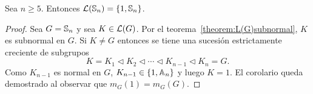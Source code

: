 \begin{corollary}
	Sea $n\geq5$. Entonces $\mathcal{L}(\mathbb{S}_n)=\{1,\mathbb{S}_n\}$. 
\end{corollary}

\begin{proof}
	Sea $G=\mathbb{S}_n$ y sea $K\in\mathcal{L}(G)$. Por el
	teorema~\ref{theorem:L(G)subnormal}, $K$ es subnormal en $G$. Si $K\ne G$
	entonces se tiene una sucesión estrictamente creciente de subgrupos 
	\[
	K=K_1\triangleleft
	K_2\triangleleft\cdots\triangleleft K_{n-1}\triangleleft K_n=G.
	\]
	Como $K_{n-1}$ es normal en $G$, $K_{n-1}\in\{1,\mathbb{A}_n\}$ y luego $K=1$. 
	El corolario queda demostrado al observar que $m_G(1)=m_G(G)$. 
\end{proof}
